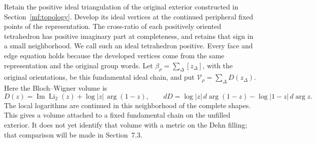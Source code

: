 \documentclass[11pt]{article}
\numberwithin{equation}{section}
\theoremstyle{definition}
\theoremstyle{remark}
\newcommand{\Ima}{\operatorname{Im}}
\begin{document}
Retain the positive ideal triangulation of the original exterior
constructed in Section~\ref{mf:topology}. Develop its ideal vertices
at the continued peripheral fixed points of the representation.
The cross-ratio of each positively oriented tetrahedron has positive
imaginary part at completeness, and retains that sign in a small
neighborhood. We call such an ideal tetrahedron positive.
Every face and edge equation holds because the developed vertices
come from the same representation and the original group words.
Let \(\beta_\rho=\sum_\Delta[z_\Delta]\), with the original
orientations, be this fundamental ideal chain, and put
\(\mathcal V_\rho=\sum_\Delta D(z_\Delta)\).
Here the Bloch--Wigner volume is
\[
 D(z)=\Ima\operatorname{Li}_2(z)+\log|z|\,\arg(1-z),\qquad
 dD=\log|z|\,d\arg(1-z)-\log|1-z|\,d\arg z .
\]
The local logarithms are continued in this neighborhood of the
complete shapes. This gives a volume attached to a fixed fundamental
chain on the unfilled exterior. It does not yet identify that volume
with a metric on the Dehn filling; that comparison will be made in
Section~7.3.
\end{document}
